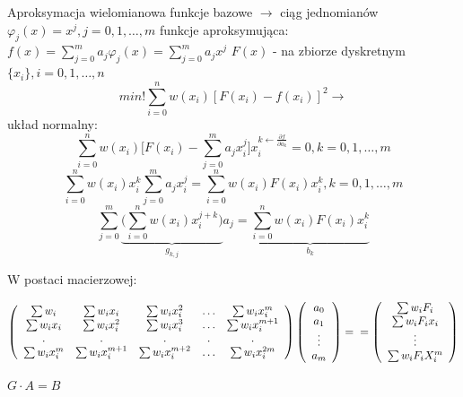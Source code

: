 \begin{frame}{Aproksymacja wielomianowa}
	funkcje bazowe $\rightarrow$ ciąg jednomianów $\varphi_j(x) = x^j,j=0,1,\ldots,m$\newline
    funkcje aproksymująca: $f(x) = \sum_{j=0}^{m}a_j\varphi_j(x)=\sum_{j=0}^{m}a_jx^j$ \newline
    $F(x)$ - na zbiorze dyskretnym $\{x_i\},i=0,1,\ldots,n$
    $$min!\sum_{i=0}^{n}w(x_i)[F(x_i)-f(x_i)]^2 \rightarrow$$
    układ normalny:
    $$\sum_{i=0}^{n}w(x_i)\bigg[F(x_i)-\sum_{j=0}^{m}a_jx_i^j\bigg]x_i^{k\leftarrow\frac{\partial f}{\partial a_k}}=0,k=0,1,\ldots,m$$
    $$\sum_{i=0}^{n}w(x_i)x_i^k\sum_{j=0}^{m}a_jx_i^j=\sum_{i=0}^{n}w(x_i)F(x_i)x_i^k,k=0,1,\ldots,m$$
    $$\sum_{j=0}^{m}\underbrace{\bigg(\sum_{i=0}^{n}w(x_i)x_i^{j+k}\bigg)}_{g_{k,j}}a_j = \underbrace{\sum_{i=0}^{n}w(x_i)F(x_i)x_i^k}_{b_k}$$
\end{frame}
\begin{frame}
	W postaci macierzowej:
    \begin{center}
    	 $\left(\begin{array}{ccccc}
    \sum w_i & \sum w_ix_i & \sum w_ix_i^2 & \ldots & \sum w_i x_i^m \\
    \sum w_ix_i & \sum w_ix_i^2 & \sum w_ix_i^3 & \ldots & \sum w_i x_i^{m+1} \\
    . & . & . & . & . \\
    \sum w_ix_i^m & \sum w_ix_i^{m+1} & \sum w_ix_i^{m+2} & \ldots & \sum w_i x_i^{2m}
    \end{array}\right)
    \left(\begin{array}{c}
    	a_0 \\ a_1 \\ \vdots \\ a_m
    \end{array}\right) =\newline=
    \left(\begin{array}{c}
    	\sum w_iF_i\\
        \sum w_i F_i x_i \\
        \vdots \\
        \sum w_i F_i X_i^m
    \end{array}\right)$
    \end{center}
    \begin{center}
    	\underline{$G \cdot A = B$}
    \end{center}
   	
\end{frame}
